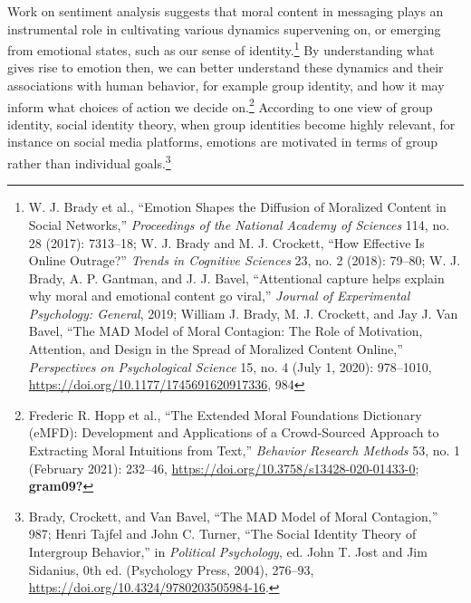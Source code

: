 \documentclass[
  12pt,
]{book}
\theoremstyle{definition}
\theoremstyle{definition}
\theoremstyle{definition}
\theoremstyle{definition}
\theoremstyle{remark}
\begin{document}
Work on sentiment analysis suggests that moral content in messaging plays an instrumental role in cultivating various dynamics supervening on, or emerging from emotional states, such as our sense of identity.\footnote{W. J. Brady et al., {``Emotion Shapes the Diffusion of Moralized Content in Social Networks,''} \emph{Proceedings of the National Academy of Sciences} 114, no. 28 (2017): 7313--18; W. J. Brady and M. J. Crockett, {``How Effective Is Online Outrage?''} \emph{Trends in Cognitive Sciences} 23, no. 2 (2018): 79--80; W. J. Brady, A. P. Gantman, and J. J. Bavel, {``Attentional capture helps explain why moral and emotional content go viral,''} \emph{Journal of Experimental Psychology: General}, 2019; William J. Brady, M. J. Crockett, and Jay J. Van Bavel, {``The {MAD} Model of Moral Contagion: The Role of Motivation, Attention, and Design in the Spread of Moralized Content Online,''} \emph{Perspectives on Psychological Science} 15, no. 4 (July 1, 2020): 978--1010, \url{https://doi.org/10.1177/1745691620917336}, 984} By understanding what gives rise to emotion then, we can better understand these dynamics and their associations with human behavior, for example group identity, and how it may inform what choices of action we decide on.\footnote{Frederic R. Hopp et al., {``The Extended {Moral Foundations Dictionary} ({eMFD}): {Development} and Applications of a Crowd-Sourced Approach to Extracting Moral Intuitions from Text,''} \emph{Behavior Research Methods} 53, no. 1 (February 2021): 232--46, \url{https://doi.org/10.3758/s13428-020-01433-0}; \textbf{gram09?}} According to one view of group identity, social identity theory, when group identities become highly relevant, for instance on social media platforms, emotions are motivated in terms of group rather than individual goals.\footnote{Brady, Crockett, and Van Bavel, {``The {MAD} Model of Moral Contagion,''} 987; Henri Tajfel and John C. Turner, {``The {Social Identity Theory} of {Intergroup Behavior},''} in \emph{Political {Psychology}}, ed. John T. Jost and Jim Sidanius, 0th ed. (Psychology Press, 2004), 276--93, \url{https://doi.org/10.4324/9780203505984-16}.}
\end{document}
